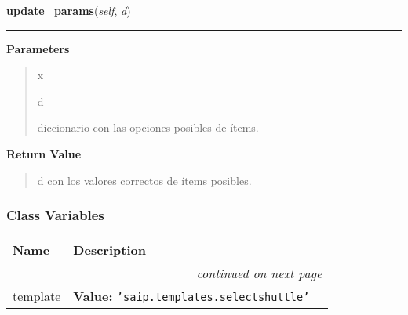     \vspace{0.5ex}

\hspace{.8\funcindent}\begin{boxedminipage}{\funcwidth}

    \raggedright \textbf{update\_params}(\textit{self}, \textit{d})

    \vspace{-1.5ex}

    \rule{\textwidth}{0.5\fboxrule}
\setlength{\parskip}{2ex}
\setlength{\parskip}{1ex}
      \textbf{Parameters}
      \vspace{-1ex}

      \begin{quote}
        \begin{Ventry}{x}

          \item[d]

          diccionario con las opciones posibles de ítems.

        \end{Ventry}

      \end{quote}

      \textbf{Return Value}
    \vspace{-1ex}

      \begin{quote}
      d con los valores correctos de ítems posibles.

      \end{quote}

    \end{boxedminipage}



  \subsubsection{Class Variables}

    \vspace{-1cm}
\hspace{\varindent}\begin{longtable}{|p{\varnamewidth}|p{\vardescrwidth}|l}
\cline{1-2}
\cline{1-2} \centering \textbf{Name} & \centering \textbf{Description}& \\
\cline{1-2}
\endhead\cline{1-2}\multicolumn{3}{r}{\small\textit{continued on next page}}\\\endfoot\cline{1-2}
\endlastfoot\raggedright t\-e\-m\-p\-l\-a\-t\-e\- & \raggedright \textbf{Value:} 
{\tt 'saip.templates.selectshuttle'}&\\
\cline{1-2}
\end{longtable}

